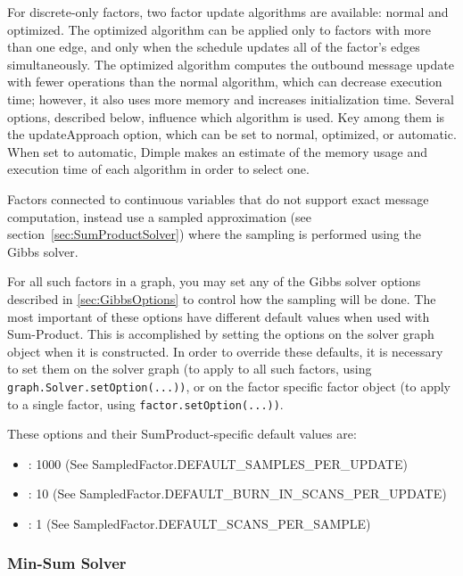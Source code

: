 For discrete-only factors, two factor update algorithms are available: normal and optimized. The optimized algorithm can be applied only to factors with more than one edge, and only when the schedule updates all of the factor's edges simultaneously. The optimized algorithm computes the outbound message update with fewer operations than the normal algorithm, which can decrease execution time; however, it also uses more memory and increases initialization time. Several options, described below, influence which algorithm is used. Key among them is the updateApproach option, which can be set to normal, optimized, or automatic. When set to automatic, Dimple makes an estimate of the memory usage and execution time of each algorithm in order to select one.



Factors connected to continuous variables that do not support exact message computation, instead use a sampled approximation (see section~\ref{sec:SumProductSolver}) where the sampling is performed using the Gibbs solver.

For all such factors in a graph, you may set any of the Gibbs solver options described in \autoref{sec:GibbsOptions} to control how the sampling will be done. The most important of these options have different default values when used with Sum-Product. This is accomplished by setting the options on the solver graph object when it is constructed. In order to override these defaults, it is necessary to set them on the solver graph (to apply to all such factors, using \texttt{graph.Solver.setOption(...))}, or on the factor specific factor object (to apply to a single factor, using \texttt{factor.setOption(...))}.

These options and their SumProduct-specific default values are:

\begin{itemize}
\item {}: 1000 \ifjava (See SampledFactor.DEFAULT\_SAMPLES\_PER\_UPDATE)\fi
\item {}: 10 \ifjava (See SampledFactor.DEFAULT\_BURN\_IN\_SCANS\_PER\_UPDATE)\fi
\item {}: 1 \ifjava (See SampledFactor.DEFAULT\_SCANS\_PER\_SAMPLE)\fi
\end{itemize}

\clearpage
\subsubsection{Min-Sum Solver}

